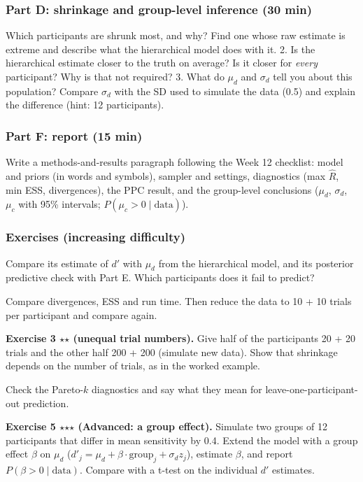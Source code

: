 \subsubsection{Part D: shrinkage and group-level inference (30 min)}

Which participants are shrunk most, and why? Find one whose raw estimate
is extreme and describe what the hierarchical model does with it. 2. Is
the hierarchical estimate closer to the truth on average? Is it closer
for \emph{every} participant? Why is that not required? 3. What do
\(\mu_d\) and \(\sigma_d\) tell you about this population? Compare
\(\sigma_d\) with the SD used to simulate the data (0.5) and explain the
difference (hint: 12 participants).

\subsubsection{Part F: report (15 min)}

Write a methods-and-results paragraph following the Week 12 checklist:
model and priors (in words and symbols), sampler and settings,
diagnostics (max \(\hat R\), min ESS, divergences), the PPC result, and
the group-level conclusions (\(\mu_d\), \(\sigma_d\), \(\mu_c\) with
95\% intervals; \(P(\mu_c > 0\mid\text{data})\)).

\subsubsection{Exercises (increasing difficulty)}

Compare its estimate of \(d'\) with \(\mu_d\) from the hierarchical
model, and its posterior predictive check with Part E. Which
participants does it fail to predict?

Compare divergences, ESS and run time. Then reduce the data to 10 + 10
trials per participant and compare again.

\textbf{Exercise 3 \ensuremath{\star}\ensuremath{\star} (unequal trial numbers).} Give half of the
participants 20 + 20 trials and the other half 200 + 200 (simulate new
data). Show that shrinkage depends on the number of trials, as in the
worked example.

Check the Pareto-\(k\) diagnostics and say what they mean for
leave-one-participant-out prediction.

\textbf{Exercise 5 \ensuremath{\star}\ensuremath{\star}\ensuremath{\star} (Advanced: a group effect).} Simulate two groups
of 12 participants that differ in mean sensitivity by 0.4. Extend the
model with a group effect \(\beta\) on \(\mu_d\)
(\(d'_j = \mu_d + \beta\cdot\text{group}_j + \sigma_d z_j\)), estimate
\(\beta\), and report \(P(\beta > 0\mid\text{data})\). Compare with a
t-test on the individual \(d'\) estimates.


